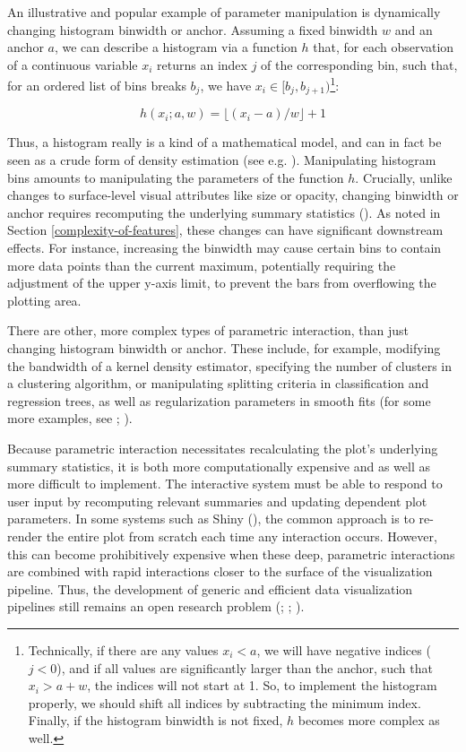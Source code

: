 \documentclass[
  openany]{book}
\theoremstyle{definition}
\theoremstyle{definition}
\theoremstyle{definition}
\theoremstyle{definition}
\theoremstyle{remark}
\begin{document}
An illustrative and popular example of parameter manipulation is dynamically changing histogram binwidth or anchor. Assuming a fixed binwidth \(w\) and an anchor \(a\), we can describe a histogram via a function \(h\) that, for each observation of a continuous variable \(x_i\) returns an index \(j\) of the corresponding bin, such that, for an ordered list of bins breaks \(b_j\), we have \(x_i \in [b_{j}, b_{j + 1})\)\footnote{Technically, if there are any values \(x_i < a\), we will have negative indices (\(j < 0\)), and if all values are significantly larger than the anchor, such that \(x_i > a + w\), the indices will not start at 1. So, to implement the histogram properly, we should shift all indices by subtracting the minimum index. Finally, if the histogram binwidth is not fixed, \(h\) becomes more complex as well.}:

\[h(x_i; a, w) = \lfloor (x_i - a) / w \rfloor + 1\]

Thus, a histogram really is a kind of a mathematical model, and can in fact be seen as a crude form of density estimation (see e.g. ). Manipulating histogram bins amounts to manipulating the parameters of the function \(h\). Crucially, unlike changes to surface-level visual attributes like size or opacity, changing binwidth or anchor requires recomputing the underlying summary statistics (). As noted in Section \ref{complexity-of-features}, these changes can have significant downstream effects. For instance, increasing the binwidth may cause certain bins to contain more data points than the current maximum, potentially requiring the adjustment of the upper y-axis limit, to prevent the bars from overflowing the plotting area.

There are other, more complex types of parametric interaction, than just changing histogram binwidth or anchor. These include, for example, modifying the bandwidth of a kernel density estimator, specifying the number of clusters in a clustering algorithm, or manipulating splitting criteria in classification and regression trees, as well as regularization parameters in smooth fits (for some more examples, see ; ).

Because parametric interaction necessitates recalculating the plot's underlying summary statistics, it is both more computationally expensive and as well as more difficult to implement. The interactive system must be able to respond to user input by recomputing relevant summaries and updating dependent plot parameters. In some systems such as Shiny (), the common approach is to re-render the entire plot from scratch each time any interaction occurs. However, this can become prohibitively expensive when these deep, parametric interactions are combined with rapid interactions closer to the surface of the visualization pipeline. Thus, the development of generic and efficient data visualization pipelines still remains an open research problem (; ; ).
\end{document}
